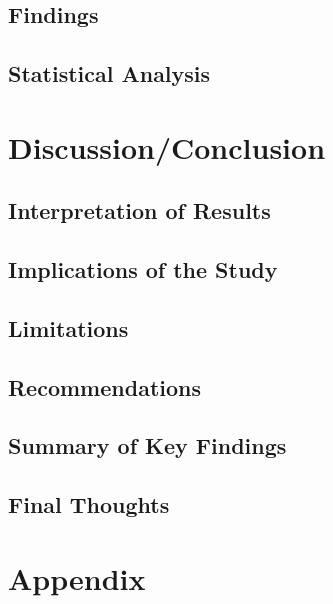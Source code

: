 \documentclass[
  11pt,
  letterpaper,
  DIV=11,
  numbers=noendperiod]{scrartcl}
\numberwithin{figure}{section}
\begin{document}
\hypertarget{findings}{%
\subsection{Findings}\label{findings}}

\hypertarget{statistical-analysis}{%
\subsection{Statistical Analysis}\label{statistical-analysis}}

\hypertarget{discussionconclusion}{%
\section{Discussion/Conclusion}\label{discussionconclusion}}

\hypertarget{interpretation-of-results}{%
\subsection{Interpretation of Results}\label{interpretation-of-results}}

\hypertarget{implications-of-the-study}{%
\subsection{Implications of the Study}\label{implications-of-the-study}}

\hypertarget{limitations}{%
\subsection{Limitations}\label{limitations}}

\hypertarget{recommendations}{%
\subsection{Recommendations}\label{recommendations}}

\hypertarget{summary-of-key-findings}{%
\subsection{Summary of Key Findings}\label{summary-of-key-findings}}

\hypertarget{final-thoughts}{%
\subsection{Final Thoughts}\label{final-thoughts}}

\hypertarget{appendix}{%
\section{Appendix}\label{appendix}}
\end{document}
